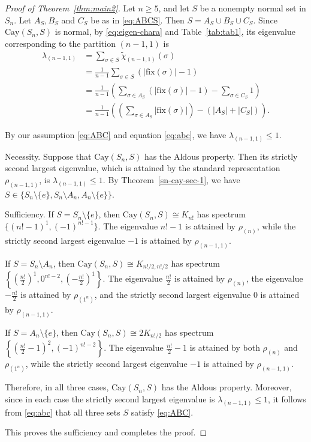 \documentclass[12pt, a4paper]{article}
\def\fix{\mathrm{fix}}
\theoremstyle{definition}
\begin{document}
\begin{proof}[Proof of Theorem~\ref{thm:main2}]
Let $n\ge 5$, and let $S$ be a nonempty normal set in $S_n$. Let $A_S, B_S$ and $C_S$ be as in \eqref{eq:ABCS}. Then $S=A_S \cup B_S \cup C_S$. Since $\mathrm{Cay}(S_n, S)$ is normal, by \eqref{eq:eigen-chara} and Table~\ref{tab:tab1}, its eigenvalue  corresponding to the partition $(n-1,1)$ is
\begin{align}
\lambda_{(n-1,1)}
& = \sum_{\sigma \in S} \tilde{\chi}_{(n-1,1)}(\sigma) \nonumber \\ 
& = \frac{1}{n-1} \sum_{\sigma \in S} (|\fix(\sigma)|-1) \nonumber \\ 
& = \frac{1}{n-1} \left(\sum_{\sigma \in A_S} (|\fix(\sigma)|-1) - \sum_{\sigma \in C_S} 1\right) \nonumber \\ 
& = \frac{1}{n-1} \left(\left(\sum_{\sigma \in A_S} |\fix(\sigma)|\right) - (|A_S|+|C_S|)\right). \label{eq:abc}
\end{align}

By our assumption \eqref{eq:ABC} and equation \eqref{eq:abc}, we have $\lambda_{(n-1,1)}\le 1$.

\smallskip
\textsf{Necessity.}
Suppose that $\mathrm{Cay}(S_n,S)$ has the Aldous property. Then its strictly second largest eigenvalue, which is attained by the standard representation $\rho_{(n-1,1)}$, is $\lambda_{(n-1,1)}\le 1$.
By Theorem~\ref{sn-cay-sec-1}, we have $S \in \{S_n\setminus\{e\}, S_n\setminus A_n, A_n\setminus\{e\}\}$.

\smallskip
\textsf{Sufficiency.}
If $S=S_n\setminus\{e\}$, then $\mathrm{Cay}(S_n,S)\cong K_{n!}$ has spectrum
\(
\{(n!-1)^1,(-1)^{n!-1}\}.
\)
The eigenvalue $n!-1$ is attained by $\rho_{(n)}$, while the strictly second largest eigenvalue $-1$ is attained by $\rho_{(n-1,1)}$.

If $S=S_n\setminus A_n$, then $\mathrm{Cay}(S_n,S)\cong K_{n!/2,n!/2}$ has spectrum
\(
\left\{\left(\frac{n!}{2}\right)^1,0^{n!-2},\left(-\frac{n!}{2}\right)^1\right\}.
\)
The eigenvalue $\frac{n!}{2}$ is attained by $\rho_{(n)}$, the eigenvalue $-\frac{n!}{2}$ is attained by $\rho_{(1^n)}$, and the strictly second largest eigenvalue $0$ is attained by $\rho_{(n-1,1)}$.

If $S=A_n\setminus\{e\}$, then $\mathrm{Cay}(S_n,S)\cong 2K_{n!/2}$ has spectrum
\(
\left\{\left(\frac{n!}{2}-1\right)^2,(-1)^{n!-2}\right\}.
\)
The eigenvalue $\frac{n!}{2}-1$ is attained by both $\rho_{(n)}$ and $\rho_{(1^n)}$, while the strictly second largest eigenvalue $-1$ is attained by $\rho_{(n-1,1)}$.

Therefore, in all three cases, $\mathrm{Cay}(S_n,S)$ has the Aldous property. 
Moreover, since in each case the strictly second largest eigenvalue is $\lambda_{(n-1,1)}\leq 1$, it follows from \eqref{eq:abc} that all three sets $S$ satisfy \eqref{eq:ABC}.

This proves the sufficiency and completes the proof.
\end{proof}
\end{document}
